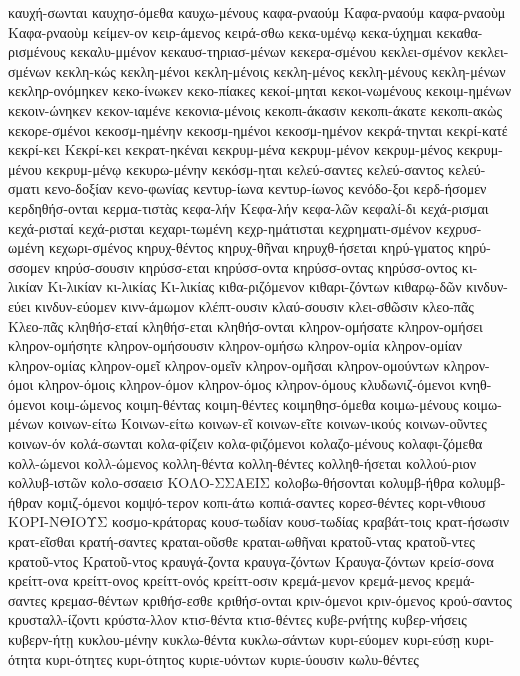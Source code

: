 {καυχή-σωνται
καυχησ-όμεθα
καυχω-μένους
καφα-ρναούμ
Καφα-ρναούμ
καφα-ρναοὺμ
Καφα-ρναοὺμ
κείμεν-ον
κειρ-άμενος
κειρά-σθω
κεκα-υμένῳ
κεκα-ύχημαι
κεκαθα-ρισμένους
κεκαλυ-μμένον
κεκαυσ-τηριασ-μένων
κεκερα-σμένου
κεκλει-σμένον
κεκλει-σμένων
κεκλη-κώς
κεκλη-μένοι
κεκλη-μένοις
κεκλη-μένος
κεκλη-μένους
κεκλη-μένων
κεκληρ-ονόμηκεν
κεκο-ίνωκεν
κεκο-πίακες
κεκοί-μηται
κεκοι-νωμένους
κεκοιμ-ημένων
κεκοιν-ώνηκεν
κεκον-ιαμένε
κεκονια-μένοις
κεκοπι-άκασιν
κεκοπι-άκατε
κεκοπι-ακὼς
κεκορε-σμένοι
κεκοσμ-ημένην
κεκοσμ-ημένοι
κεκοσμ-ημένον
κεκρά-τηνται
κεκρί-κατέ
κεκρί-κει
Κεκρί-κει
κεκρατ-ηκέναι
κεκρυμ-μένα
κεκρυμ-μένον
κεκρυμ-μένος
κεκρυμ-μένου
κεκρυμ-μένῳ
κεκυρω-μένην
κεκόσμ-ηται
κελεύ-σαντες
κελεύ-σαντος
κελεύ-σματι
κενο-δοξίαν
κενο-φωνίας
κεντυρ-ίωνα
κεντυρ-ίωνος
κενόδο-ξοι
κερδ-ήσομεν
κερδηθήσ-ονται
κερμα-τιστὰς
κεφα-λήν
Κεφα-λήν
κεφα-λῶν
κεφαλί-δι
κεχά-ρισμαι
κεχά-ρισταί
κεχά-ρισται
κεχαρι-τωμένη
κεχρ-ημάτισται
κεχρηματι-σμένον
κεχρυσ-ωμένη
κεχωρι-σμένος
κηρυχ-θέντος
κηρυχ-θῆναι
κηρυχθ-ήσεται
κηρύ-γματος
κηρύ-σσομεν
κηρύσ-σουσιν
κηρύσσ-εται
κηρύσσ-οντα
κηρύσσ-οντας
κηρύσσ-οντος
κι-λικίαν
Κι-λικίαν
κι-λικίας
Κι-λικίας
κιθα-ριζόμενον
κιθαρι-ζόντων
κιθαρῳ-δῶν
κινδυν-εύει
κινδυν-εύομεν
κινν-άμωμον
κλέπτ-ουσιν
κλαύ-σουσιν
κλει-σθῶσιν
κλεο-πᾶς
Κλεο-πᾶς
κληθήσ-εταί
κληθήσ-εται
κληθήσ-ονται
κληρον-ομήσατε
κληρον-ομήσει
κληρον-ομήσητε
κληρον-ομήσουσιν
κληρον-ομήσω
κληρον-ομία
κληρον-ομίαν
κληρον-ομίας
κληρον-ομεῖ
κληρον-ομεῖν
κληρον-ομῆσαι
κληρον-ομούντων
κληρον-όμοι
κληρον-όμοις
κληρον-όμον
κληρον-όμος
κληρον-όμους
κλυδωνιζ-όμενοι
κνηθ-όμενοι
κοιμ-ώμενος
κοιμη-θέντας
κοιμη-θέντες
κοιμηθησ-όμεθα
κοιμω-μένους
κοιμω-μένων
κοινων-είτω
Κοινων-είτω
κοινων-εῖ
κοινων-εῖτε
κοινων-ικούς
κοινων-οῦντες
κοινων-όν
κολά-σωνται
κολα-φίζειν
κολα-φιζόμενοι
κολαζο-μένους
κολαφι-ζόμεθα
κολλ-ώμενοι
κολλ-ώμενος
κολλη-θέντα
κολλη-θέντες
κολληθ-ήσεται
κολλού-ριον
κολλυβ-ιστῶν
κολο-σσαεισ
ΚΟΛΟ-ΣΣΑΕΙΣ
κολοβω-θήσονται
κολυμβ-ήθρα
κολυμβ-ήθραν
κομιζ-όμενοι
κομψό-τερον
κοπι-άτω
κοπιά-σαντες
κορεσ-θέντες
κορι-νθιουσ
ΚΟΡΙ-ΝΘΙΟΥΣ
κοσμο-κράτορας
κουσ-τωδίαν
κουσ-τωδίας
κραβάτ-τοις
κρατ-ήσωσιν
κρατ-εῖσθαι
κρατή-σαντες
κραται-οῦσθε
κραται-ωθῆναι
κρατοῦ-ντας
κρατοῦ-ντες
κρατοῦ-ντος
Κρατοῦ-ντος
κραυγά-ζοντα
κραυγα-ζόντων
Κραυγα-ζόντων
κρείσ-σονα
κρείττ-ονα
κρείττ-ονος
κρείττ-ονός
κρείττ-οσιν
κρεμά-μενον
κρεμά-μενος
κρεμά-σαντες
κρεμασ-θέντων
κριθήσ-εσθε
κριθήσ-ονται
κριν-όμενοι
κριν-όμενος
κρού-σαντος
κρυσταλλ-ίζοντι
κρύστα-λλον
κτισ-θέντα
κτισ-θέντες
κυβε-ρνήτης
κυβερ-νήσεις
κυβερν-ήτῃ
κυκλου-μένην
κυκλω-θέντα
κυκλω-σάντων
κυρι-εύομεν
κυρι-εύσῃ
κυρι-ότητα
κυρι-ότητες
κυρι-ότητος
κυριε-υόντων
κυριε-ύουσιν
κωλυ-θέντες
}
